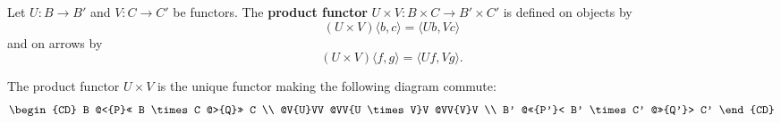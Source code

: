 Let $U: B \to B'$ and $V: C \to C'$ be functors. The \textbf{product functor} $U \times V: B \times C \to B' \times C'$ is defined on objects by
$$(U \times V)\langle b, c \rangle = \langle Ub, Vc \rangle$$
and on arrows by
$$(U \times V)\langle f, g \rangle = \langle Uf, Vg \rangle.$$

The product functor $U \times V$ is the unique functor making the following diagram commute:
$$\begin{CD}
B @<{P}<< B \times C @>{Q}>> C \\
@V{U}VV @VV{U \times V}V @VV{V}V \\
B' @<<{P'}< B' \times C' @>>{Q'}> C'
\end{CD}$$
